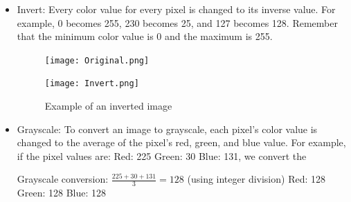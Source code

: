 \begin{itemize}
\item Invert:
Every color value for every pixel is changed to its inverse value. For example, 0 becomes 255, 230 becomes 25, and 127 becomes 128.
Remember that the minimum color value is 0 and the maximum is 255.

\vfill
\begin{figure}[ht]
\begin{minipage}[b]{0.47\linewidth}
\centering
\texttt{[image: Original.png]}
\end{minipage}
\hspace{0.1cm}
\begin{minipage}[b]{0.47\linewidth}
\centering
\texttt{[image: Invert.png]}
\end{minipage}
\caption{Example of an inverted image}
\end{figure}
\vfill

\item Grayscale:
To convert an image to grayscale, each pixel’s color value is changed to the average of 
the pixel’s red, green, and blue value. For example, if the pixel values are:
Red: 225 Green: 30 Blue: 131, we convert the 

Grayscale conversion: $\frac{225 + 30 + 131}{3} = 128$ (using integer division)
Red: 128 Green: 128 Blue: 128


\end{itemize}
